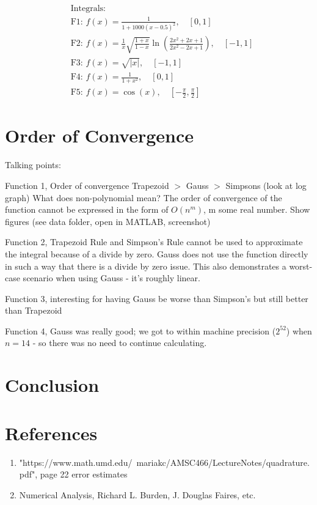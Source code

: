 \documentclass[12pt]{article}
\begin{document}
\begin{align*}
	 & \text{Integrals:}                                                                                                         \\
	 & \text{F1: }f(x) = \frac{1}{1 + 1000(x - 0.5)^2}, \quad [0, 1]                                                             \\
	 & \text{F2: }f(x) = \frac{1}{x}\sqrt{\frac{1 + x}{1 - x}}\ln\left(\frac{2x^2 + 2x + 1}{2x^2 - 2x + 1}\right), \quad [-1, 1] \\
	 & \text{F3: }f(x) = \sqrt{|x|}, \quad [-1, 1]                                                                               \\
	 & \text{F4: }f(x) = \frac{1}{1 + x^2}, \quad [0, 1]                                                                         \\
	 & \text{F5: }f(x) = \cos(x), \quad [-\frac{\pi}{2}, \frac{\pi}{2}]
\end{align*}

\section{Order of Convergence}

Talking points:

Function 1, Order of convergence Trapezoid $>$ Gauss $>$ Simpsons (look at log graph)
What does non-polynomial mean? The order of convergence of the function cannot be
expressed in the form of $O(n^m)$, m some real number. Show figures (see data folder,
open in MATLAB, screenshot)

Function 2, Trapezoid Rule and Simpson's Rule cannot be used to approximate the integral
because of a divide by zero. Gauss does not use the function directly in such a way
that there is a divide by zero issue. This also demonstrates a worst-case scenario
when using Gauss - it's roughly linear.

Function 3, interesting for having Gauss be worse than Simpson's but still better than
Trapezoid

Function 4, Gauss was really good; we got to within machine precision ($2^52$) when $n = 14$ - so
there was no need to continue calculating.

\section{Conclusion}

\newpage
\section{References}

\begin{enumerate}
	\item "https://www.math.umd.edu/~mariakc/AMSC466/LectureNotes/quadrature.pdf", page 22 error estimates
	\item Numerical Analysis, Richard L. Burden, J. Douglas Faires, etc.
\end{enumerate}
\end{document}
